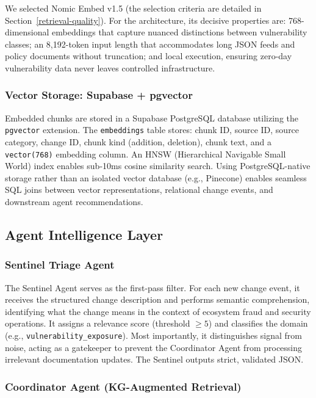 \documentclass[
]{article}
\begin{document}
We selected Nomic Embed v1.5 (the selection criteria are detailed in Section~\ref{retrieval-quality}). For the architecture, its decisive properties are: 768-dimensional embeddings that capture nuanced distinctions between vulnerability classes; an 8,192-token input length that accommodates long JSON feeds and policy documents without truncation; and local execution, ensuring zero-day vulnerability data never leaves controlled infrastructure.

\subsubsection{Vector Storage: Supabase + pgvector}

Embedded chunks are stored in a Supabase PostgreSQL database utilizing the \texttt{pgvector} extension. The \texttt{embeddings} table stores: chunk ID, source ID, source category, change ID, chunk kind (addition, deletion), chunk text, and a \texttt{vector(768)} embedding column. An HNSW (Hierarchical Navigable Small World) index enables sub-10ms cosine similarity search. Using PostgreSQL-native storage rather than an isolated vector database (e.g., Pinecone) enables seamless SQL joins between vector representations, relational change events, and downstream agent recommendations.

\subsection{Agent Intelligence Layer}\label{agent-intelligence-layer}

\subsubsection{Sentinel Triage Agent}

The Sentinel Agent serves as the first-pass filter. For each new change event, it receives the structured change description and performs semantic comprehension, identifying what the change means in the context of ecosystem fraud and security operations. It assigns a relevance score (threshold $\geq5$) and classifies the domain (e.g., \texttt{vulnerability\_exposure}). Most importantly, it distinguishes signal from noise, acting as a gatekeeper to prevent the Coordinator Agent from processing irrelevant documentation updates. The Sentinel outputs strict, validated JSON.

\subsubsection{Coordinator Agent (KG-Augmented Retrieval)}
\end{document}
